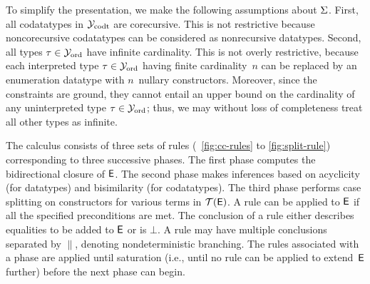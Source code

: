 To simplify the presentation, we make the following assumptions about $\mathrm{\Sigma}$.
First, all codatatypes in $\mathcal{Y}_{\mathrm{codt}}$ are corecursive. This is not restrictive
because noncorecursive codatatypes can be considered as nonrecursive
datatypes.
Second, all types $\tau \in \mathcal{Y}_{\mathrm{ord}}$ have infinite cardinality.
This is not overly restrictive, because each interpreted type $\tau \in \mathcal{Y}_{\mathrm{ord}}$
having finite cardinality~$n$
can be replaced by an enumeration datatype with $n$~nullary constructors.
Moreover, since the constraints are ground, they cannot entail an upper bound
on the cardinality of any uninterpreted type $\tau \in \mathcal{Y}_{\mathrm{ord}}$; thus,
we may without loss of completeness treat all other types as infinite.

The calculus consists of three sets of rules (\figuresname~\ref{fig:cc-rules} to
\ref{fig:split-rule}) corresponding to three successive phases. The first
phase computes the bidirectional closure of $\mathsf{E}$. The second phase makes
inferences based on acyclicity (for datatypes) and bisimilarity (for
codatatypes). The third phase performs case splitting on constructors for
various terms in $\mathcal{T}(\mathsf{E})$.
A rule can be applied to $\mathsf{E}$ if all the specified preconditions are met.
The conclusion of a rule either describes equalities to be added to $\mathsf{E}$
or is $\bot$.
A rule may have multiple conclusions separated by $\parallel$,
denoting nondeterministic branching. The rules associated with a phase are
applied until saturation (i.e., until no rule can be applied to extend~$\mathsf{E}$
further) before the next phase can begin.


